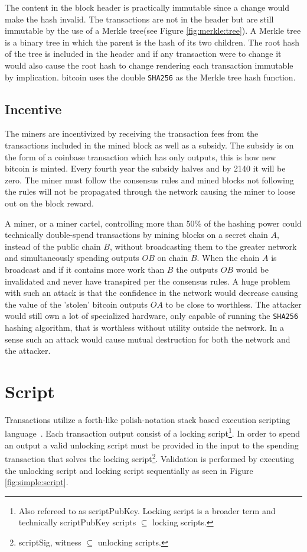 The content in the block header is practically immutable since a change would make the \gls{hash} invalid. The transactions are not in the header but are still immutable by the use of a Merkle tree(see Figure \ref{fig:merkle:tree}). A Merkle tree is a binary tree in which the parent is the hash of its two children. The root hash of the tree is included in the header and if any transaction were to change it would also cause the root hash to change rendering each transaction immutable by implication. \gls{bitcoin} uses the double \texttt{SHA256} as the Merkle tree hash function.

\subsection{Incentive}

The miners are incentivized by receiving the transaction fees from the transactions included in the mined block as well as a subsidy. The subsidy is on the form of a coinbase transaction which has only outputs, this is how new bitcoin is minted. Every fourth year the subsidy halves and by 2140 it will be zero. The miner must follow the consensus rules and mined blocks not following the rules will not be propagated through the network causing the miner to loose out on the block reward.

A \gls{miner}, or a miner cartel, controlling more than 50\% of the hashing power could technically double-spend transactions by mining blocks on a secret chain $A$, instead of the public chain $B$, without broadcasting them to the greater network and simultaneously spending outputs $OB$ on chain $B$. When the chain $A$ is broadcast and if it contains more work than $B$ the outputs $OB$ would be invalidated and never have transpired per the consensus rules. A huge problem with such an attack is that the confidence in the network would decrease causing the value of the 'stolen' bitcoin outputs $OA$ to be close to worthless. The attacker would still own a lot of specialized hardware, only capable of running the \texttt{SHA256} hashing algorithm, that is worthless without utility outside the network. In a sense such an attack would cause mutual destruction for both the network and the attacker. 

\section{Script}
\label{sec:script}

Transactions utilize a forth-like polish-notation stack based execution scripting language~\cite{antonopoulos:mastering:bitcoin}. Each transaction output consist of a locking script\footnote{Also refereed to as scriptPubKey. Locking script is a broader term and technically scriptPubKey scripts $ \subseteq $ locking scripts.}. In order to spend an output a valid unlocking script must be provided in the input to the spending transaction that solves the locking script\footnote{scriptSig, witness $\subseteq $ unlocking scripts.}. Validation is performed by executing the unlocking script and locking script sequentially as seen in Figure \ref{fig:simple:script}. 


